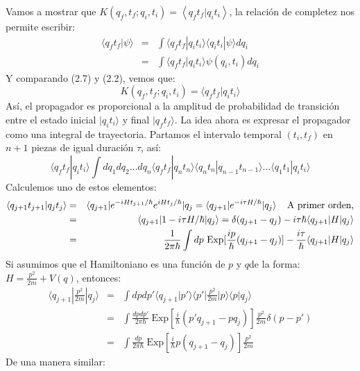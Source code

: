 Vamos a mostrar que $K(q_f,t_f;q_i,t_i)=\left\langle q_ft_f|q_it_i \right\rangle$, la relación de completez nos permite escribir:
\begin{eqnarray}
\nonumber \langle q_ft_f|\psi\rangle &=& \int\langle q_ft_f|q_it_i\rangle\langle q_it_i|\psi\rangle dq_i\\
&=& \int \langle q_ft_f|q_it_i\rangle \psi(q_i,t_i)dq_i
\end{eqnarray}
Y comparando (2.7) y (2.2), vemos que:
\begin{equation}
K(q_f,t_f;q_i,t_i)=\langle q_ft_f|q_it_i\rangle
\end{equation}
Así, el propagador es proporcional a la amplitud de probabilidad de transición entre el estado inicial $|q_it_i\rangle$ y final $|q_ft_f\rangle$. La idea ahora es expresar el propagador como una integral de trayectoria. Partamos el intervalo temporal $(t_i,t_f)$ en $n+1$ piezas de igual duración $\tau$, así:
\begin{equation}
\langle q_ft_f|q_it_i\rangle \int dq_1dq_2...dq_n\langle q_ft_f|q_nt_n\rangle \langle q_nt_n|q_{n-1}t_{n-1}\rangle...\langle q_1t_1|q_it_i\rangle
\end{equation}
Calculemos uno de estos elementos:
\begin{eqnarray}
\nonumber \langle q_{j+1}t_{j+1}|q_jt_j\rangle &=&\langle q_{j+1}|e^{-iHt_{j+1}/\hbar}e^{iHt_j/\hbar}|q_j=\langle q_{j+1}|e^{-i\tau H/\hbar}|q_j\rangle \hspace{0.4cm}\text{A primer orden,}\\
\nonumber &=&\langle q_{j+1}|1-i\tau H/\hbar|q_j\rangle=\delta(q_{j+1}-q_j)-i\tau\hbar\langle q_{j+1}|H|q_j\rangle\\
&=& \frac{1}{2\pi\hbar}\int dp\ \text{Exp}[\frac{ip}{\hbar}(q_{j+1}-q_j)]-\frac{i\tau}{\hbar}\langle q_{j+1}|H|q_j\rangle 
\end{eqnarray}	
Si asumimos que el Hamiltoniano es una función de $p$ y $q$de la forma: $H=\frac{p^2}{2m}+V(q)$, entonces:
\begin{eqnarray}
\nonumber \langle q_{j+1}|\frac{p^2}{2m}|q_j \rangle &=& \int dpdp\prime \langle q_{j+1}|p\prime\rangle\langle p\prime|\frac{p^2}{2m}|p\rangle \langle p|q_j \rangle\\
\nonumber &=&\int \frac{dpdp\prime}{2\pi\hbar}\ \text{Exp}[\frac{i}{\hbar}(p\prime q_{j+1}-pq_j)]\frac{p^2}{2m}\delta(p-p\prime)\\
&=& \int \frac{dp}{2\pi\hbar}\ \text{Exp}[\frac{i}{\hbar}p(q_{j+1}-q_j)]\frac{p^2}{2m}
\end{eqnarray}
De una manera similar:
